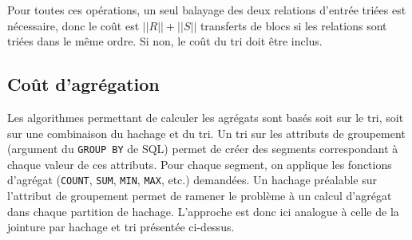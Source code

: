 Pour toutes ces opérations, un seul balayage des deux relations d'entrée triées est nécessaire, donc le coût est $||R|| + ||S||$ transferts de blocs si les relations sont triées dans le même ordre. Si non, le coût du tri doit être inclus.

\subsection{Coût d'agrégation}
Les algorithmes permettant de calculer les agrégats sont basés soit sur le tri, soit sur une combinaison du hachage et du tri. Un tri sur les attributs de groupement (argument du \texttt{GROUP BY} de SQL) permet de créer des segments correspondant à chaque valeur de ces attributs. Pour chaque segment, on applique les fonctions d’agrégat (\texttt{COUNT}, \texttt{SUM}, \texttt{MIN}, \texttt{MAX}, etc.) demandées. Un hachage préalable sur l’attribut de groupement permet de ramener le problème à un calcul d’agrégat dans chaque partition de hachage. L’approche est donc ici analogue à celle de la jointure par hachage et tri présentée ci-dessus.
